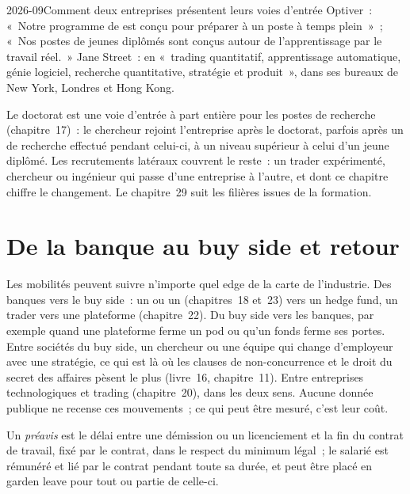 \begin{dated}{2026-09}{Comment deux entreprises présentent leurs voies d'entrée}\label{dat:in:career-paths-and-moves:entry}
Optiver~: «~Notre programme de  est conçu pour préparer à un poste à temps plein~»~; «~Nos postes de jeunes diplômés sont conçus autour
de l'apprentissage par le travail réel.~» Jane Street~:  en «~trading quantitatif, apprentissage automatique, génie logiciel,
recherche quantitative, stratégie et produit~», dans ses bureaux de New York, Londres et Hong Kong.
\end{dated}

Le doctorat est une voie d'entrée à part entière pour les postes de recherche (chapitre~17)~: le chercheur rejoint l'entreprise après le doctorat,
parfois après un  de recherche effectué pendant celui-ci, à un niveau supérieur à celui d'un jeune diplômé. Les recrutements latéraux couvrent le reste~: un
trader expérimenté, chercheur ou ingénieur qui passe d'une entreprise à l'autre, et dont ce chapitre chiffre le changement. Le chapitre~29 suit les
filières issues de la formation.

\section{De la banque au buy side et retour}

Les mobilités peuvent suivre n'importe quel edge de la carte de l'industrie. Des banques vers le buy side~: un  ou un 
(chapitres~18 et~23) vers un hedge fund, un trader vers une plateforme (chapitre~22). Du buy side vers les banques, par exemple quand une
plateforme ferme un pod ou qu'un fonds ferme ses portes. Entre sociétés du buy side, un chercheur ou une équipe qui change d'employeur avec une stratégie, ce qui est
là où les clauses de non-concurrence et le droit du secret des affaires pèsent le plus (livre~16, chapitre~11). Entre entreprises technologiques et trading
(chapitre~20), dans les deux sens. Aucune donnée publique ne recense ces mouvements~; ce qui peut être mesuré, c'est leur coût.

\begin{definition}[Préavis]\label{def:in:career-paths-and-moves:notice}
Un \emph{préavis} est le délai entre une démission ou un licenciement et la fin du contrat de travail,
fixé par le contrat, dans le respect du minimum légal~; le salarié est rémunéré et lié par le contrat pendant toute sa durée, et peut être
placé en garden leave pour tout ou partie de celle-ci.
\end{definition}

